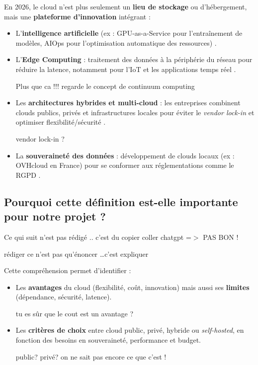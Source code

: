 \documentclass{report} %
\begin{document}
En 2026, le cloud n’est plus seulement un \textbf{lieu de stockage} ou
d’hébergement, mais une \textbf{plateforme d’innovation} intégrant :
\begin{itemize}
\item L’\textbf{intelligence artificielle} (ex : GPU-as-a-Service pour
  l’entraînement de modèles, AIOps pour l’optimisation automatique des
  ressources) \cite{LeBigData2026}.
\item L’\textbf{Edge Computing} : traitement des données à la
  périphérie du réseau pour réduire la latence, notamment pour l’IoT
  et les applications temps réel \cite{Syslearn2026}.

  {\color{red} Plus que ca !!! regarde le concept de continuum computing }
  
\item Les \textbf{architectures hybrides et multi-cloud} : les
  entreprises combinent clouds publics, privés et infrastructures
  locales pour éviter le \textit{vendor lock-in} et optimiser
  flexibilité/sécurité \cite{ObjetConnecte2026}.

  {\color{red} vendor lock-in ? }

  
\item La \textbf{souveraineté des données} : développement de clouds
  locaux (ex : OVHcloud en France) pour se conformer aux
  réglementations comme le RGPD \cite{TechInsider2026}.
\end{itemize}

\subsection{Pourquoi cette définition est-elle importante pour notre projet ?}

{\color{red} Ce qui suit n'est pas rédigé .. c'est du copier coller chatgpt  =$>$ PAS BON !}

\begin{Huge}
  {\color{red}rédiger ce n'est pas qu'énoncer \ldots c'est expliquer}  
\end{Huge}


Cette compréhension permet d’identifier :
\begin{itemize}
\item Les \textbf{avantages} du cloud (flexibilité, coût, innovation)
  mais aussi ses \textbf{limites} (dépendance, sécurité, latence).

  {\color{red} tu es sûr que le cout est un avantage  ?}
\item Les \textbf{critères de choix} entre cloud public, privé,
  hybride ou \textit{self-hosted}, en fonction des besoins en
  souveraineté, performance et budget.

  {\color{red} public? privé? on ne sait pas encore ce que c'est !}
\end{itemize}
\end{document}
